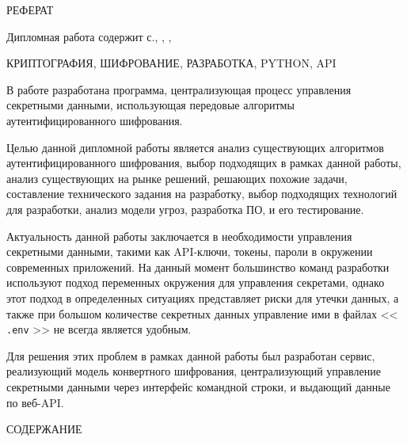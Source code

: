 \documentclass[14pt, a4paper]{extarticle}
\renewcommand{\texttt}[1]{%
  {\def\UrlFont{\ttfamily}\nolinkurl{#1}}%
}
\begin{document}
	
	
	

	\thispagestyle{empty}
	
	{\centering РЕФЕРАТ\par}
	
	\vspace*{\baselineskip}
	
	Дипломная работа содержит \pageref*{bib:end} с., \tablesBeforeBib{} \russianTables{\tablesBeforeBib}, \totalappendices{} \russianAppendices{\totalappendices}, \totalbibitems{} \russianSources{\totalbibitems}
	
	\vspace*{\baselineskip}
	
	КРИПТОГРАФИЯ, ШИФРОВАНИЕ, РАЗРАБОТКА, PYTHON, API
	
	\vspace*{\baselineskip}
	
	В работе разработана программа, централизующая процесс управления секретными данными, использующая передовые алгоритмы аутентифицированного шифрования.
	
	Целью данной дипломной работы является анализ существующих алгоритмов аутентифицированного шифрования, выбор подходящих в рамках данной работы, анализ существующих на рынке решений, решающих похожие задачи, составление технического задания на разработку, выбор подходящих технологий для разработки, анализ модели угроз, разработка ПО, и его тестирование.
	
	Актуальность данной работы заключается в необходимости управления секретными данными, такими как API-ключи, токены, пароли в окружении современных приложений. На данный момент большинство команд разработки используют подход переменных окружения для управления секретами, однако этот подход в определенных ситуациях представляет риски для утечки данных, а также при большом количестве секретных данных управление ими в файлах <<\texttt{.env}>> не всегда является удобным.
	
	Для решения этих проблем в рамках данной работы был разработан сервис, реализующий модель конвертного шифрования, централизующий управление секретными данными через интерфейс командной строки, и выдающий данные по веб-API.
		\newpage

	{\centering СОДЕРЖАНИЕ\par}
	
	\vspace*{-1.6cm}

	\tableofcontents
	\newpage
	
\end{document}
